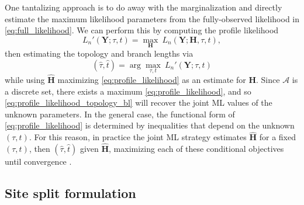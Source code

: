 \documentclass[a4paper]{article}
\newcommand{\alphabet}{\mathcal{A}}
\newcommand{\fullAlignment}{\mathbf{Y}}
\newcommand{\fullAncestralStates}{\mathbf{H}}
\newcommand{\nCols}{n}
\begin{document}
One tantalizing approach is to do away with the marginalization and directly estimate the maximum likelihood parameters from the fully-observed likelihood in \eqref{eq:full_likelihood}.
We can perform this by computing the profile likelihood
\begin{equation}
\label{eq:profile_likelihood}
L_\nCols'(\fullAlignment;\tau, t) = \max_{\fullAncestralStates} \ L_\nCols(\fullAlignment;\fullAncestralStates, \tau, t),
\end{equation}
then estimating the topology and branch lengths via
\begin{equation}
\label{eq:profile_likelihood_topology_bl}
(\hat{\tau}, \hat{t}) = \arg\max_{\tau, t} \ L_\nCols'(\fullAlignment;\tau, t)
\end{equation}
while using $\hat{\fullAncestralStates}$ maximizing \eqref{eq:profile_likelihood} as an estimate for $\fullAncestralStates$.
Since $\alphabet$ is a discrete set, there exists a maximum \eqref{eq:profile_likelihood}, and so \eqref{eq:profile_likelihood_topology_bl} will recover the joint ML values of the unknown parameters.
In the general case, the functional form of \eqref{eq:profile_likelihood} is determined by inequalities that depend on the unknown $(\tau,t)$.
For this reason, in practice the joint ML strategy estimates $\hat{\fullAncestralStates}$ for a fixed $(\tau,t)$, then $(\hat{\tau},\hat{t})$ given $\hat{\fullAncestralStates}$, maximizing each of these conditional objectives until convergence \cite{Neher2017}.

\subsection{Site split formulation}
\end{document}
